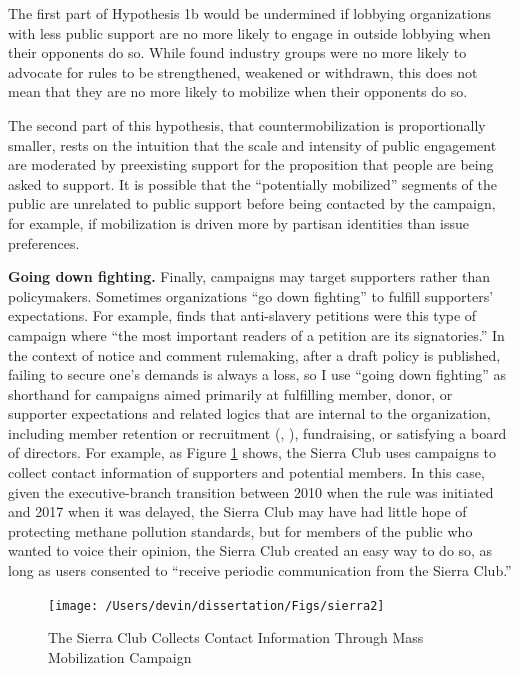 \documentclass[
      12pt,
        ]{article}
\begin{document}
The first part of Hypothesis 1b would be undermined if lobbying organizations
with less public support are no more likely to engage in outside
lobbying when their opponents do so. While \citet{Potter2017} found industry
groups were no more likely to advocate for rules to be strengthened,
weakened or withdrawn, this does not mean that they are no more likely
to mobilize when their opponents do so.

The second part of this hypothesis, that countermobilization is
proportionally smaller, rests on the intuition that the scale and
intensity of public engagement are moderated by preexisting support for
the proposition that people are being asked to support. It is possible
that the ``potentially mobilized'' segments of the public are unrelated to
public support before being contacted by the campaign, for example, if
mobilization is driven more by partisan identities than issue
preferences.

\textbf{Going down fighting.} Finally, campaigns may target supporters rather
than policymakers. Sometimes organizations ``go down fighting'' to fulfill
supporters' expectations. For example, \citet{Carpenter2020} finds that anti-slavery petitions were this type of campaign where ``the most important readers of a
petition are its signatories.'' In the context of notice and comment rulemaking, after a draft policy is published, failing to secure one's demands is always a loss, so I use ``going down fighting'' as shorthand for
campaigns aimed primarily at fulfilling member, donor, or supporter
expectations and related logics that are internal to the organization,
including member retention or recruitment (\citet{Carpenter2014b}, \citet{Carpenter2020}), fundraising, or satisfying a
board of directors. For example, as Figure
\ref{fig:sierra} shows, the Sierra Club uses campaigns to collect
contact information of supporters and potential members. In this case,
given the executive-branch transition between 2010 when the rule was
initiated and 2017 when it was delayed, the Sierra Club may have had
little hope of protecting methane pollution standards, but for members
of the public who wanted to voice their opinion, the Sierra Club created
an easy way to do so, as long as users consented to ``receive periodic
communication from the Sierra Club.''

\begin{figure}

{\centering \texttt{[image: /Users/devin/dissertation/Figs/sierra2]} 

}

\caption{The Sierra Club Collects Contact Information Through Mass Mobilization Campaign}\label{fig:sierra}
\end{figure}
\end{document}
